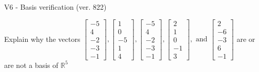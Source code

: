 \begin{exercise}
  \begin{exerciseTitle}V6 - Basis verification (ver. 822)\end{exerciseTitle}
  \begin{exerciseStatement}
    Explain why the vectors \(\left[\begin{array}{r}
-5 \\
4 \\
-2 \\
-3 \\
-1
\end{array}\right] , \left[\begin{array}{r}
1 \\
0 \\
-5 \\
1 \\
4
\end{array}\right] , \left[\begin{array}{r}
-5 \\
4 \\
-2 \\
-3 \\
-1
\end{array}\right] , \left[\begin{array}{r}
2 \\
1 \\
0 \\
-1 \\
3
\end{array}\right] , \text{ and } \left[\begin{array}{r}
2 \\
-6 \\
-3 \\
6 \\
-1
\end{array}\right]\) are or are not a basis of \(\mathbb{R}^5\)	



\end{exerciseStatement}
\end{exercise}
